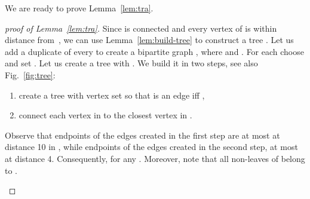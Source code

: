 \documentclass{article}
\theoremstyle{plain}
\theoremstyle{definition}
\begin{document}
We are ready to prove Lemma~\ref{lem:tra}.

\begin{proof}[proof of Lemma~\ref{lem:tra}]
Since  is connected and every vertex of  is within distance  from~,
we can use Lemma~\ref{lem:build-tree} to construct a tree .
Let us add a duplicate  of every  to create a bipartite graph
, where  and .
For each  choose  and set  .
Let us create a tree  with .
We build it in two steps, see also Fig.~\ref{fig:tree}:
\begin{enumerate}
  \item create a tree with vertex set  so that  is an edge iff
  ,
  \item connect each vertex in  to the closest vertex
  in .
\end{enumerate}
Observe that endpoints of the edges created in the first step are at most at
distance 10 in , while endpoints of the edges created in the second step, at
most at distance 4.
Consequently,  for any .
Moreover, note that all non-leaves of  belong to .

\begin{figure}
\begin{center}
\end{center}
\end{figure}
\end{proof}
\end{document}
